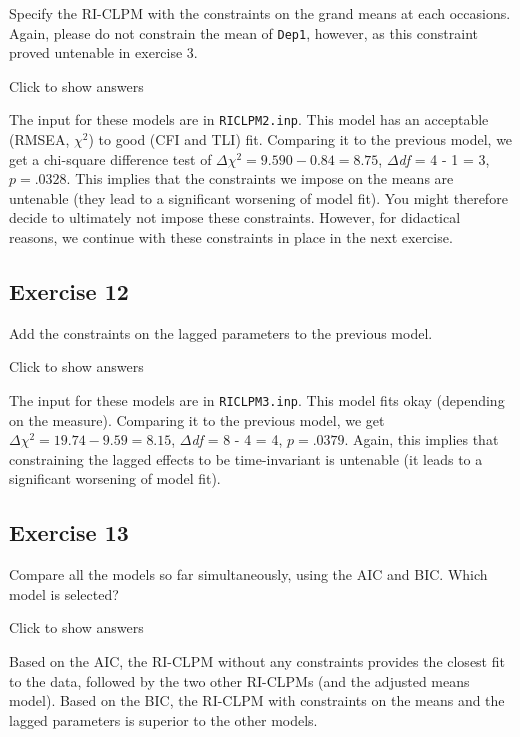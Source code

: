 \documentclass[
]{book}
\begin{document}
Specify the RI-CLPM with the constraints on the grand means at each occasions. Again, please do not constrain the mean of \texttt{Dep1}, however, as this constraint proved untenable in exercise 3.

Click to show answers

The input for these models are in \texttt{RICLPM2.inp}. This model has an acceptable (RMSEA, \(\chi^{2}\)) to good (CFI and TLI) fit. Comparing it to the previous model, we get a chi-square difference test of \(\Delta\chi^{2} = 9.590 - 0.84 = 8.75\), \(\Delta\)\emph{df} = 4 - 1 = 3, \(p = .0328\). This implies that the constraints we impose on the means are untenable (they lead to a significant worsening of model fit). You might therefore decide to ultimately not impose these constraints. However, for didactical reasons, we continue with these constraints in place in the next exercise.

\hypertarget{exercise-12}{%
\subsection{Exercise 12}\label{exercise-12}}

Add the constraints on the lagged parameters to the previous model.

Click to show answers

The input for these models are in \texttt{RICLPM3.inp}. This model fits okay (depending on the measure). Comparing it to the previous model, we get \(\Delta\chi^{2} = 19.74 - 9.59 = 8.15\), \(\Delta\)\emph{df} = 8 - 4 = 4, \(p = .0379\). Again, this implies that constraining the lagged effects to be time-invariant is untenable (it leads to a significant worsening of model fit).

\hypertarget{exercise-13}{%
\subsection{Exercise 13}\label{exercise-13}}

Compare all the models so far simultaneously, using the AIC and BIC. Which model is selected?

Click to show answers

Based on the AIC, the RI-CLPM without any constraints provides the closest fit to the data, followed by the two other RI-CLPMs (and the adjusted means model). Based on the BIC, the RI-CLPM with constraints on the means and the lagged parameters is superior to the other models.
\end{document}
